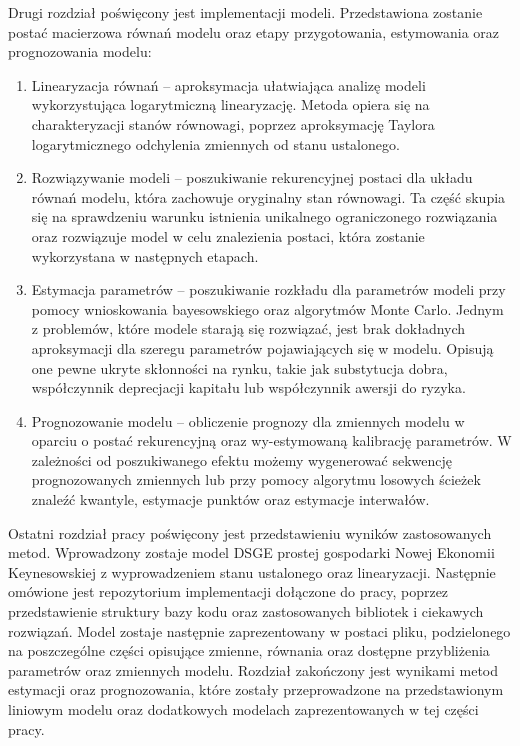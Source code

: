 Drugi rozdział poświęcony jest implementacji modeli. Przedstawiona zostanie postać macierzowa równań modelu oraz etapy przygotowania, estymowania oraz prognozowania modelu:
\begin{enumerate}
    \item Linearyzacja równań -- aproksymacja ułatwiająca analizę modeli wykorzystująca logarytmiczną linearyzację. Metoda opiera się na charakteryzacji stanów równowagi, poprzez aproksymację Taylora logarytmicznego odchylenia zmiennych od stanu ustalonego.
    \item Rozwiązywanie modeli -- poszukiwanie rekurencyjnej postaci dla układu równań modelu, która zachowuje oryginalny stan równowagi. Ta część skupia się na sprawdzeniu warunku istnienia unikalnego ograniczonego rozwiązania oraz rozwiązuje model w celu znalezienia postaci, która zostanie wykorzystana w następnych etapach.
    \item Estymacja parametrów -- poszukiwanie rozkładu dla parametrów modeli przy pomocy wnioskowania bayesowskiego oraz algorytmów Monte Carlo. Jednym z problemów, które modele starają się rozwiązać, jest brak dokładnych aproksymacji dla szeregu parametrów pojawiających się w modelu. Opisują one pewne ukryte skłonności na rynku, takie jak substytucja dobra, współczynnik deprecjacji kapitału lub współczynnik awersji do ryzyka. 
    \item Prognozowanie modelu -- obliczenie prognozy dla zmiennych modelu w oparciu o postać rekurencyjną oraz wy-estymowaną kalibrację parametrów. W zależności od poszukiwanego efektu możemy wygenerować sekwencję prognozowanych zmiennych lub przy pomocy algorytmu losowych ścieżek znaleźć kwantyle, estymacje punktów oraz estymacje interwałów.
\end{enumerate}

Ostatni rozdział pracy poświęcony jest przedstawieniu wyników zastosowanych metod. Wprowadzony zostaje model DSGE prostej gospodarki Nowej Ekonomii Keynesowskiej z wyprowadzeniem stanu ustalonego oraz linearyzacji. Następnie omówione jest repozytorium implementacji dołączone do pracy, poprzez przedstawienie struktury bazy kodu oraz zastosowanych bibliotek i ciekawych rozwiązań. Model zostaje następnie zaprezentowany w postaci pliku, podzielonego na poszczególne części opisujące zmienne, równania oraz dostępne przybliżenia parametrów oraz zmiennych modelu. Rozdział zakończony jest wynikami metod estymacji oraz prognozowania, które zostały przeprowadzone na przedstawionym liniowym modelu oraz dodatkowych modelach zaprezentowanych w tej części pracy.